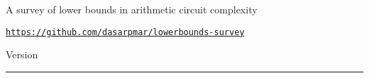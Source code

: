 \documentclass[12pt]{report}
\author{%
    Ramprasad Saptharishi \\
    Tata Institute of Fundamental Research \\
    \texttt{ramprasad@tifr.res.in}
    }
\makeatletter
\def\printauthor{%
    {\large \@author}}
\makeatother
\begin{document}
\begin{titlepage}
\noindent
\vspace*{1cm}

\titlefont A survey of lower bounds in arithmetic circuit complexity
\epigraph{\tt \url{https://github.com/dasarpmar/lowerbounds-survey}}{Version \currentversion}
\null\vfill
\vspace*{1cm}
\noindent
\hfill
\begin{minipage}{0.50\linewidth}
    \begin{flushright}

      \vspace*{1cm}

        \printauthor

        \ccbyncsa


    \end{flushright}
\end{minipage}
%
\begin{minipage}{0.02\linewidth}
    \rule{1pt}{100pt}
\end{minipage}
\end{titlepage}



\end{document}
